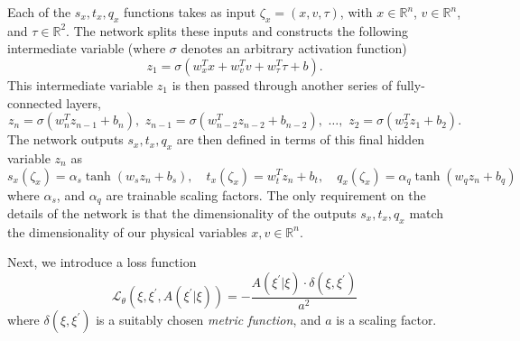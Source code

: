 \documentclass{article} %
\begin{document}
Each of the \(s_{x}, t_{x}, q_{x}\) functions takes as input \(\zeta_{x} = (x, v, \tau)\), with \(x\in\mathbb{R}^{n}\),
\(v\in\mathbb{R}^{n}\), and \(\tau \in \mathbb{R}^{2}\).
%
The network splits these inputs and constructs the following intermediate variable (where \(\sigma\) denotes an
arbitrary activation function)
%
\begin{equation}
   z_{1} = \sigma(w_{x}^{T}x + w_{v}^{T}v + w_{\tau}^{T}\tau + b).
\end{equation}
%
This intermediate variable \(z_{1}\) is then passed through another series of fully-connected layers,
%
\begin{equation}
   z_{n} = \sigma(w_{n}^{T} z_{n-1} + b_{n}),\,\, z_{n-1}=\sigma(w_{n-2}^{T}z_{n-2} + b_{n-2}),\,\,%
   \ldots,\,\, z_{2} = \sigma(w_{2}^{T} z_{1} + b_{2}).
\end{equation}
%
The network outputs \(s_{x}, t_{x}, q_{x}\) are then defined in terms of this final hidden variable \(z_{n}\) as
%
\begin{equation}
   s_{x}(\zeta_{x}) = \alpha_{s}\tanh(w_{s}z_{n} + b_{s}),\quad
   t_{x}(\zeta_{x}) = w_{t}^{T}z_{n} + b_{t},\quad
   q_{x}(\zeta_{x}) = \alpha_{q}\tanh(w_{q}z_{n} + b_{q})
\end{equation}
%
where \(\alpha_{s}\), and \(\alpha_{q}\) are trainable scaling factors.
%
The only requirement on the details of the network is that the dimensionality of the outputs \(s_{x}, t_{x}, q_{x}\)
match the dimensionality of our physical variables \(x, v \in\mathbb{R}^{n}\).
%

Next, we introduce a loss function
%
\begin{equation}
   \mathcal{L}_{\theta}{\left(\xi, \xi^{\prime}, A(\xi^{\prime}|\xi)\right)}
      = -\frac{A(\xi^{\prime}|\xi)\cdot \delta(\xi, \xi^{\prime})}{a^{2}}
\end{equation}
%
where \(\delta(\xi, \xi^{\prime})\) is a suitably chosen \emph{metric function}, and \(a\) is a scaling factor.
%
\end{document}
